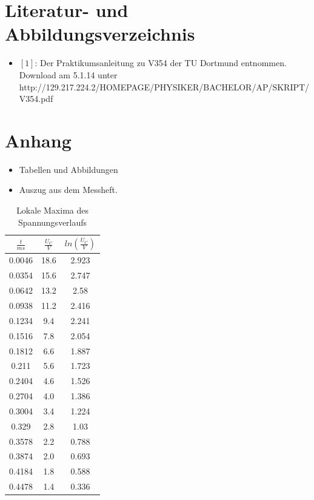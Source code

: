 \documentclass[11pt,ngerman,a4paper]{article}
\begin{document}
\section{Literatur- und Abbildungsverzeichnis}
\begin{itemize}
\item $[1]$: Der Praktikumsanleitung zu V354 der TU Dortmund entnommen. Download am 5.1.14 unter \newline http://129.217.224.2/HOMEPAGE/PHYSIKER/BACHELOR/AP/SKRIPT/V354.pdf
\end{itemize}
\section{Anhang}
\begin{itemize}
\item Tabellen und Abbildungen
\item Auszug aus dem Messheft.


\end{itemize}

\newpage
\begin{table}[H]
\centering
\begin{tabular}{|c|c|c|}
\hline
$\frac{t}{ms}$ & $\frac{U_C}{V}$ & $ln(\frac{U_C}{V})$ \\
\hline
0.0046 & 18.6 & 2.923\\
0.0354 & 15.6 & 2.747\\
0.0642 & 13.2 & 2.58\\
0.0938 & 11.2 & 2.416\\
0.1234 & 9.4 & 2.241\\
0.1516 & 7.8 & 2.054\\
0.1812 & 6.6 & 1.887\\
0.211 & 5.6 & 1.723\\
0.2404 & 4.6 & 1.526\\
0.2704 & 4.0 & 1.386\\
0.3004 & 3.4 & 1.224\\
0.329 & 2.8 & 1.03\\
0.3578 & 2.2 & 0.788\\
0.3874 & 2.0 & 0.693\\
0.4184 & 1.8 & 0.588\\
0.4478 & 1.4 & 0.336\\
\hline
\end{tabular}
\label{mtab1}
\caption{Lokale Maxima des Spannungsverlaufs}
\end{table}
\end{document}
